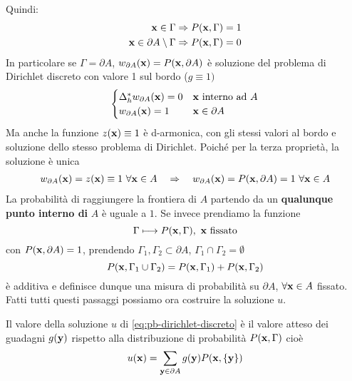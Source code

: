 Quindi:
\begin{align*}
    \mathbf{x}\in \Gamma                    & \Rightarrow P(\mathbf{x},\Gamma)=1 \\
    \mathbf{x}\in \partial A\setminus\Gamma & \Rightarrow P(\mathbf{x},\Gamma)=0
\end{align*}
In particolare se $\Gamma =\partial A$, $w_{\partial A}(\mathbf{x}) =P(\mathbf{x},\partial A)$ è soluzione del problema di Dirichlet discreto con valore 1 sul bordo ($g\equiv 1)$
\begin{equation*}
    \begin{cases}
        \Delta ^{*}_{h} w_{\partial A}(\mathbf{x}) =0 & \mathbf{x}\ \text{interno ad} \ A \\
        w_{\partial A}(\mathbf{x}) =1                 & \mathbf{x}\in \partial A
    \end{cases}
\end{equation*}
Ma anche la funzione $z(\mathbf{x}) \equiv 1$ è d-armonica, con gli stessi valori al bordo e soluzione dello stesso problema di Dirichlet. Poiché per la terza proprietà, la soluzione è unica
\begin{gather*}
    w_{\partial A}(\mathbf{x}) =z(\mathbf{x}) \equiv 1\ \forall \mathbf{x}\in A \quad \Rightarrow \quad w_{\partial A}(\mathbf{x}) =P(\mathbf{x},\partial A) =1\ \forall \mathbf{x}\in A
\end{gather*}
La probabilità di raggiungere la frontiera di $A$ partendo da un \textbf{qualunque punto interno di} $A$ è uguale a $1$. Se invece prendiamo la funzione
\begin{equation*}
    \Gamma \longmapsto P(\mathbf{x},\Gamma),\ \mathbf{x}\ \text{fissato}
\end{equation*}
con $P(\mathbf{x},\partial A) =1$, prendendo $\Gamma _{1},\Gamma _{2} \subset \partial A$, $\Gamma _{1} \cap \Gamma _{2} =\emptyset $
\begin{equation*}
    P(\mathbf{x},\Gamma _{1} \cup \Gamma _{2}) =P(\mathbf{x},\Gamma _{1}) +P(\mathbf{x},\Gamma _{2})
\end{equation*}
è additiva e definisce dunque una misura di probabilità su $\partial A$, $\forall \mathbf{x}\in A$ fissato. Fatti tutti questi passaggi possiamo ora costruire la soluzione $u$.
\begin{theorem}
    Il valore della soluzione $u$ di \eqref{eq:pb-dirichlet-discreto} è il valore atteso dei guadagni $g(\mathbf{y})$ rispetto alla distribuzione di probabilità $P(\mathbf{x},\Gamma)$ cioè
    \begin{equation*}
        u(\mathbf{x}) =\sum _{\mathbf{y}\in \partial A} g(\mathbf{y}) P(\mathbf{x},\{\mathbf{y}\})
    \end{equation*}
\end{theorem}
